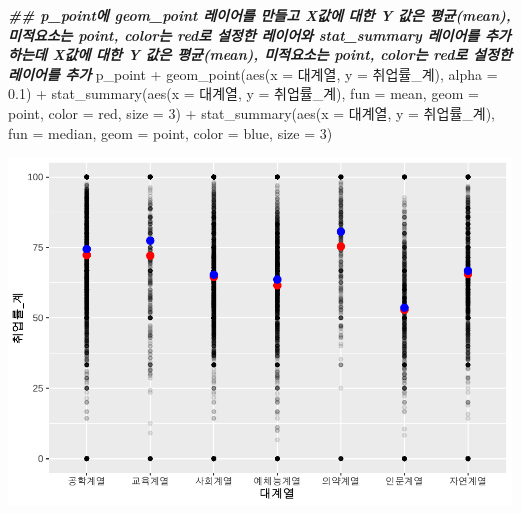 \documentclass[
]{article}
\newenvironment{Shaded}{\begin{snugshade}}{\end{snugshade}}
\newcommand{\AttributeTok}[1]{\textcolor[rgb]{0.77,0.63,0.00}{#1}}
\newcommand{\DecValTok}[1]{\textcolor[rgb]{0.00,0.00,0.81}{#1}}
\newcommand{\DocumentationTok}[1]{\textcolor[rgb]{0.56,0.35,0.01}{\textbf{\textit{#1}}}}
\newcommand{\FloatTok}[1]{\textcolor[rgb]{0.00,0.00,0.81}{#1}}
\newcommand{\FunctionTok}[1]{\textcolor[rgb]{0.00,0.00,0.00}{#1}}
\newcommand{\NormalTok}[1]{#1}
\newcommand{\SpecialCharTok}[1]{\textcolor[rgb]{0.00,0.00,0.00}{#1}}
\newcommand{\StringTok}[1]{\textcolor[rgb]{0.31,0.60,0.02}{#1}}
\begin{document}
\begin{Shaded}
\begin{Highlighting}[]
\DocumentationTok{\#\# p\_point에 geom\_point 레이어를 만들고 X값에 대한 Y 값은 평균(mean), 미적요소는 point, color는 \textquotesingle{}red\textquotesingle{}로 설정한 레이어와 stat\_summary 레이어를 추가하는데 X값에 대한 Y 값은 평균(mean), 미적요소는 point, color는 \textquotesingle{}red\textquotesingle{}로 설정한 레이어를 추가 }
\NormalTok{p\_point }\SpecialCharTok{+} 
  \FunctionTok{geom\_point}\NormalTok{(}\FunctionTok{aes}\NormalTok{(}\AttributeTok{x =}\NormalTok{ 대계열, }\AttributeTok{y =}\NormalTok{ 취업률\_계), }\AttributeTok{alpha =} \FloatTok{0.1}\NormalTok{) }\SpecialCharTok{+}
  \FunctionTok{stat\_summary}\NormalTok{(}\FunctionTok{aes}\NormalTok{(}\AttributeTok{x =}\NormalTok{ 대계열, }\AttributeTok{y =}\NormalTok{ 취업률\_계), }\AttributeTok{fun =} \StringTok{\textquotesingle{}mean\textquotesingle{}}\NormalTok{, }\AttributeTok{geom =} \StringTok{\textquotesingle{}point\textquotesingle{}}\NormalTok{, }\AttributeTok{color =} \StringTok{\textquotesingle{}red\textquotesingle{}}\NormalTok{, }\AttributeTok{size =} \DecValTok{3}\NormalTok{) }\SpecialCharTok{+}
    \FunctionTok{stat\_summary}\NormalTok{(}\FunctionTok{aes}\NormalTok{(}\AttributeTok{x =}\NormalTok{ 대계열, }\AttributeTok{y =}\NormalTok{ 취업률\_계), }\AttributeTok{fun =} \StringTok{\textquotesingle{}median\textquotesingle{}}\NormalTok{, }\AttributeTok{geom =} \StringTok{\textquotesingle{}point\textquotesingle{}}\NormalTok{, }\AttributeTok{color =} \StringTok{\textquotesingle{}blue\textquotesingle{}}\NormalTok{, }\AttributeTok{size =} \DecValTok{3}\NormalTok{)}
\end{Highlighting}
\end{Shaded}

\includegraphics{chap3_files/figure-latex/unnamed-chunk-53-2.pdf}
\end{document}
